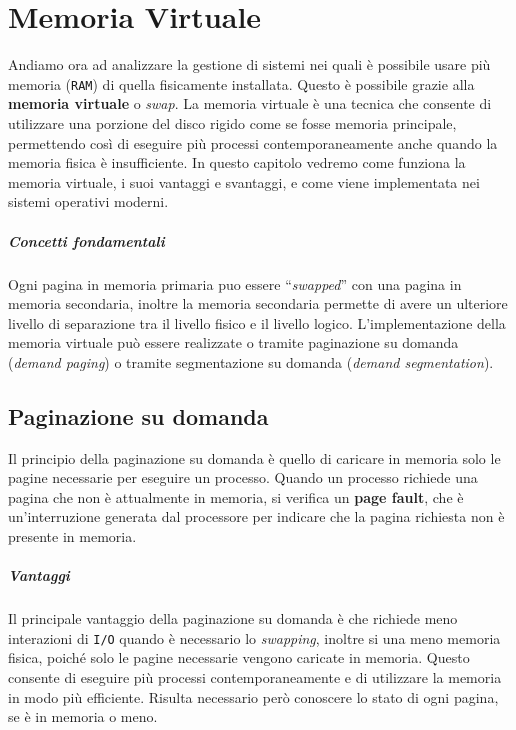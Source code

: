 \chapter{Memoria Virtuale}
Andiamo ora ad analizzare la gestione di sistemi nei quali è possibile usare più memoria (\texttt{RAM}) di quella fisicamente installata. Questo è possibile grazie alla \textbf{memoria virtuale} o \textit{swap}. La memoria virtuale è una tecnica che consente di utilizzare una porzione del disco rigido come se fosse memoria principale, permettendo così di eseguire più processi contemporaneamente anche quando la memoria fisica è insufficiente. In questo capitolo vedremo come funziona la memoria virtuale, i suoi vantaggi e svantaggi, e come viene implementata nei sistemi operativi moderni.
\paragraph{Concetti fondamentali}
    Ogni pagina in memoria primaria puo essere ``\textit{swapped}'' con una pagina in memoria secondaria, inoltre la memoria secondaria permette di avere un ulteriore livello di separazione tra il livello fisico e il livello logico. L'implementazione della memoria virtuale può essere realizzate o tramite paginazione su domanda (\textit{demand paging}) o tramite segmentazione su domanda (\textit{demand segmentation}). 

\section{Paginazione su domanda}
    Il principio della paginazione su domanda è quello di caricare in memoria solo le pagine necessarie per eseguire un processo. Quando un processo richiede una pagina che non è attualmente in memoria, si verifica un \textbf{page fault}, che è un'interruzione generata dal processore per indicare che la pagina richiesta non è presente in memoria.
    \paragraph{Vantaggi} Il principale vantaggio della paginazione su domanda è che richiede meno interazioni di \texttt{I/O} quando è necessario lo \textit{swapping}, inoltre si una meno memoria fisica, poiché solo le pagine necessarie vengono caricate in memoria. Questo consente di eseguire più processi contemporaneamente e di utilizzare la memoria in modo più efficiente. Risulta necessario però conoscere lo stato di ogni pagina, se è in memoria o meno.
